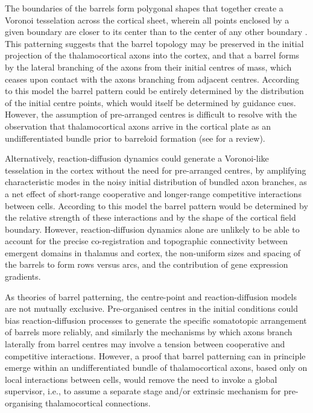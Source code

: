 \documentclass[a4paper,11pt]{article}
\begin{document}
The boundaries of the barrels form polygonal shapes that together create a Voronoi tesselation across the cortical sheet, wherein all points enclosed by a given boundary are closer to its center than to the center of any other boundary \citep{Senft1991}. This patterning suggests that the barrel topology may be preserved in the initial projection of the thalamocortical axons into the cortex, and that a barrel forms by the lateral branching of the axons from their initial centres of mass, which ceases upon contact with the axons branching from adjacent centres. According to this model the barrel pattern could be entirely determined by the distribution of the initial centre points, which would itself be determined by guidance cues. However, the assumption of pre-arranged centres is difficult to resolve with the observation that thalamocortical axons arrive in the cortical plate as an undifferentiated bundle prior to barreloid formation (see \citealp{Erzurumlu2012} for a review).

Alternatively, reaction-diffusion dynamics could generate a Voronoi-like tesselation in the cortex without the need for pre-arranged centres, by amplifying characteristic modes in the noisy initial distribution of bundled axon branches, as a net effect of short-range cooperative and longer-range competitive interactions between cells. According to this model the barrel pattern would be determined by the relative strength of these interactions and by the shape of the cortical field boundary. However, reaction-diffusion dynamics alone are unlikely to be able to account for the precise co-registration and topographic connectivity between emergent domains in thalamus and cortex, the non-uniform sizes and spacing of the barrels to form rows versus arcs, and the contribution of gene expression gradients. 

As theories of barrel patterning, the centre-point and reaction-diffusion models are not mutually exclusive. Pre-organised centres in the initial conditions could bias reaction-diffusion processes to generate the specific somatotopic arrangement of barrels more reliably, and similarly the mechanisms by which axons branch laterally from barrel centres may involve a tension between cooperative and competitive interactions. However, a proof that barrel patterning can in principle emerge within an undifferentiated bundle of thalamocortical axons, based only on local interactions between cells, would remove the need to invoke a global supervisor, i.e., to assume a separate stage and/or extrinsic mechanism for pre-organising thalamocortical connections.
\end{document}
